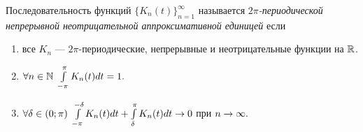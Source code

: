 \begin{Def}
    Последовательность функций $\{K_n(t)\}_{n=1}^\infty$ называется  \textit{ $2\pi$-периодической непрерывной неотрицательной аппроксимативной единицей} если
    \begin{enumerate}
        \item все $K_n$ --- $2\pi$-периодические, непрерывные и неотрицательные функции на $\mathbb{R}$.
        \item $\forall n \in \mathbb{N}\  \int\limits_{-\pi}^{\pi} K_n(t)dt = 1.$        \item $\forall \delta \in (0; \pi)\  \int\limits_{-\pi}^{-\delta} K_n(t)dt + \int\limits_{\delta}^{\pi} K_n(t)dt\rightarrow 0$ при $n \rightarrow \infty.$
    \end{enumerate}
\end{Def}
